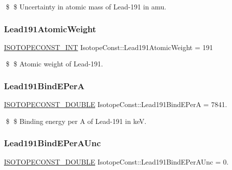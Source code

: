 \$ \$ Uncertainty in atomic mass of Lead-\/191 in amu. \mbox{\label{group___isotope_const-_lead-_pb191_ga7e2f90d84532663469020218d456ecb8}} 
\subsubsection{\texorpdfstring{Lead191\+Atomic\+Weight}{Lead191AtomicWeight}}
{\footnotesize\ttfamily \mbox{\hyperlink{group___isotope_const-_macros_ga5f18360b3e99483a35c32d789e62621c}{I\+S\+O\+T\+O\+P\+E\+C\+O\+N\+S\+T\+\_\+\+I\+NT}} Isotope\+Const\+::\+Lead191\+Atomic\+Weight = 191}

\$ \$ Atomic weight of Lead-\/191. \mbox{\label{group___isotope_const-_lead-_pb191_ga22454ffd1c8db50670040986bc424fd6}} 
\subsubsection{\texorpdfstring{Lead191\+Bind\+E\+PerA}{Lead191BindEPerA}}
{\footnotesize\ttfamily \mbox{\hyperlink{group___isotope_const-_macros_ga8f45a7272ce02c0b4c65c44636ed719a}{I\+S\+O\+T\+O\+P\+E\+C\+O\+N\+S\+T\+\_\+\+D\+O\+U\+B\+LE}} Isotope\+Const\+::\+Lead191\+Bind\+E\+PerA = 7841.}

\$ \$ Binding energy per A of Lead-\/191 in keV. \mbox{\label{group___isotope_const-_lead-_pb191_ga4729ce128bcf1df0d3a6d1f810a57f60}} 
\subsubsection{\texorpdfstring{Lead191\+Bind\+E\+Per\+A\+Unc}{Lead191BindEPerAUnc}}
{\footnotesize\ttfamily \mbox{\hyperlink{group___isotope_const-_macros_ga8f45a7272ce02c0b4c65c44636ed719a}{I\+S\+O\+T\+O\+P\+E\+C\+O\+N\+S\+T\+\_\+\+D\+O\+U\+B\+LE}} Isotope\+Const\+::\+Lead191\+Bind\+E\+Per\+A\+Unc = 0.}

